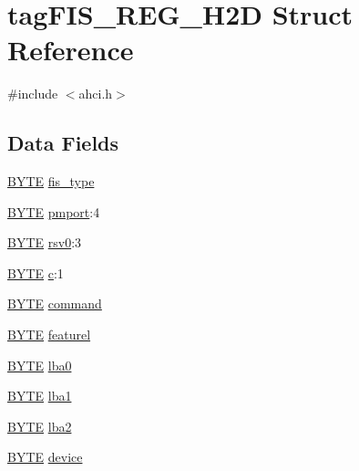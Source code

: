 \hypertarget{structtagFIS__REG__H2D}{}\section{tag\+F\+I\+S\+\_\+\+R\+E\+G\+\_\+\+H2D Struct Reference}
\label{structtagFIS__REG__H2D}


{\ttfamily \#include $<$ahci.\+h$>$}

\subsection*{Data Fields}
\begin{DoxyCompactItemize}
\item 
\hyperlink{ahci_8h_aae9749d96e15ccb4f482dd5f55d98f9b}{B\+Y\+TE} \hyperlink{structtagFIS__REG__H2D_ae7e5a980a6c9a44dd0de328d857a1c26}{fis\+\_\+type}
\item 
\hyperlink{ahci_8h_aae9749d96e15ccb4f482dd5f55d98f9b}{B\+Y\+TE} \hyperlink{structtagFIS__REG__H2D_aa3d53495bb86fbb278d0fa761cf3c1d2}{pmport}\+:4
\item 
\hyperlink{ahci_8h_aae9749d96e15ccb4f482dd5f55d98f9b}{B\+Y\+TE} \hyperlink{structtagFIS__REG__H2D_a2303b7cd4b3e3a74fc91f2eb40d461ef}{rsv0}\+:3
\item 
\hyperlink{ahci_8h_aae9749d96e15ccb4f482dd5f55d98f9b}{B\+Y\+TE} \hyperlink{structtagFIS__REG__H2D_af3d7ccfa012a57fabf91a0e37d6af7aa}{c}\+:1
\item 
\hyperlink{ahci_8h_aae9749d96e15ccb4f482dd5f55d98f9b}{B\+Y\+TE} \hyperlink{structtagFIS__REG__H2D_af7352549480792f12cb42c7c849efa6c}{command}
\item 
\hyperlink{ahci_8h_aae9749d96e15ccb4f482dd5f55d98f9b}{B\+Y\+TE} \hyperlink{structtagFIS__REG__H2D_ad3f073a0cdf82ba724d27cf04d8fc533}{featurel}
\item 
\hyperlink{ahci_8h_aae9749d96e15ccb4f482dd5f55d98f9b}{B\+Y\+TE} \hyperlink{structtagFIS__REG__H2D_ad2e058be53c7f303fa777fd3b2ab5053}{lba0}
\item 
\hyperlink{ahci_8h_aae9749d96e15ccb4f482dd5f55d98f9b}{B\+Y\+TE} \hyperlink{structtagFIS__REG__H2D_aed0b3493ff6d85b41ba8bcacb1899bc0}{lba1}
\item 
\hyperlink{ahci_8h_aae9749d96e15ccb4f482dd5f55d98f9b}{B\+Y\+TE} \hyperlink{structtagFIS__REG__H2D_ab52b470ae60a9537a94705f4634acdb3}{lba2}
\item 
\hyperlink{ahci_8h_aae9749d96e15ccb4f482dd5f55d98f9b}{B\+Y\+TE} \hyperlink{structtagFIS__REG__H2D_a5d8089c35168c052bb286900a14c501a}{device}

\end{DoxyCompactItemize}
